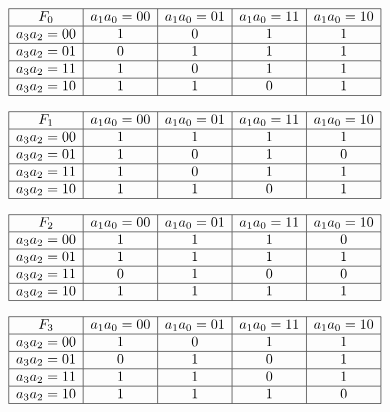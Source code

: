 
\begin{center}
$\begin{array}{|c|c|c|c|c|}
\hline
F_0 & a_1a_0=00 & a_1a_0=01 & a_1a_0=11 & a_1a_0=10 \\
\hline
a_3a_2=00  &  1  &  0  & 1   &  1  \\
\hline
a_3a_2=01  &  0  &   1 &  1  &  1  \\
\hline
a_3a_2=11  &  1  &  0  &  1  &  1  \\
\hline
a_3a_2=10  &  1  & 1   &  0  &  1  \\
\hline
\end{array}$
\end{center}

\begin{center}
$\begin{array}{|c|c|c|c|c|}
\hline
F_1 & a_1a_0=00 & a_1a_0=01 & a_1a_0=11 & a_1a_0=10 \\
\hline
a_3a_2=00  & 1   &  1  &  1  &  1  \\
\hline
a_3a_2=01  &  1  &  0  & 1   & 0   \\
\hline
a_3a_2=11  &   1 & 0   & 1   & 1   \\
\hline
a_3a_2=10  &  1  & 1   & 0   & 1   \\
\hline
\end{array}$
\end{center}

\begin{center}
$\begin{array}{|c|c|c|c|c|}
\hline
F_2 & a_1a_0=00 & a_1a_0=01 & a_1a_0=11 & a_1a_0=10 \\
\hline
a_3a_2=00  &  1  & 1   & 1   &  0  \\
\hline
a_3a_2=01  &  1  &  1  &  1  &  1  \\
\hline
a_3a_2=11  &  0  & 1   & 0   &  0  \\
\hline
a_3a_2=10  &  1  &  1  &  1  & 1   \\
\hline
\end{array}$
\end{center}

\begin{center}
$\begin{array}{|c|c|c|c|c|}
\hline
F_3 & a_1a_0=00 & a_1a_0=01 & a_1a_0=11 & a_1a_0=10 \\
\hline
a_3a_2=00  &  1  &  0  &  1  &   1 \\
\hline
a_3a_2=01  &  0  &  1  &  0  &  1  \\
\hline
a_3a_2=11  &  1  &  1  &  0  &  1  \\
\hline
a_3a_2=10  &  1  & 1   &  1  & 0   \\
\hline
\end{array}$
\end{center}

